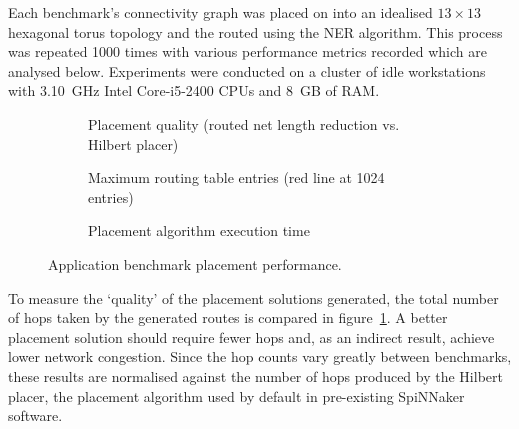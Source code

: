 				Each benchmark's connectivity graph was placed on into an idealised $13
				\times 13$ hexagonal torus topology and the routed using the NER
				algorithm. This process was repeated \num{1000} times with various
				performance metrics recorded which are analysed below. Experiments were
				conducted on a cluster of idle workstations with 3.10~GHz Intel
				Core-i5-2400 CPUs and 8~GB of RAM.
			
				\begin{figure}
					\center
					\begin{subfigure}{\linewidth}
						\center
						
						\caption{Placement quality (routed net length reduction vs. Hilbert
						placer)}
						\label{fig:application-benchmarks-quality}
					\end{subfigure}
					
					\vspace*{1em}
					
					\begin{subfigure}{\linewidth}
						\center
						
						\caption{Maximum routing table entries (red line at \num{1024} entries)}
						\label{fig:application-benchmarks-tables}
					\end{subfigure}
					
					\vspace*{1em}
					
					\begin{subfigure}{\linewidth}
						\center
						
						\caption{Placement algorithm execution time}
						\label{fig:application-benchmarks-runtime}
					\end{subfigure}
					
					\caption{Application benchmark placement performance.}
					\label{fig:application-benchmarks}
				\end{figure}
				
				To measure the `quality' of the placement solutions generated, the
				total number of hops taken by the generated routes is compared in
				figure~\ref{fig:application-benchmarks-quality}. A better placement
				solution should require fewer hops and, as an indirect result, achieve
				lower network congestion.  Since the hop counts vary greatly between
				benchmarks, these results are normalised against the number of hops
				produced by the Hilbert placer, the placement algorithm used by default
				in pre-existing SpiNNaker software.
				
